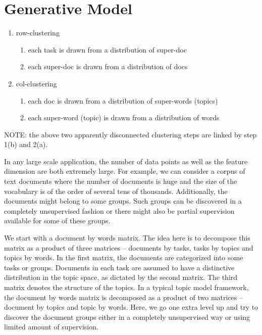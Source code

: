 \documentclass[10pts,fleqn]{article}
\begin{document}
\section{Generative Model}

\begin{enumerate}
	\item row-clustering
	\begin{enumerate}
		\item each task is drawn from a distribution of super-doc
		\item each super-doc is drawn from a distribution of docs
	\end{enumerate}
	\item col-clustering
	\begin{enumerate}
		\item each doc is drawn from a distribution of super-words (topics)
		\item each super-word (topic) is drawn from a distribution of words
	\end{enumerate}
\end{enumerate}
NOTE: the above two apparently disconnected clustering steps are linked by step 1(b) and 2(a).

In any large scale application, the number of data points as well as the feature
dimension are both extremely large. For example, we can consider a corpus of
text documents where the number of documents is huge and the size of the vocabulary is
of the order of several tens of thousands. Additionally, the documents might belong
to some groups. Such groups can be discovered in a completely unsupervised fashion
or there might also be partial supervision available for some of these groups.

We start with a document by words matrix. The idea here is to decompose this matrix as a product of
three matrices -- documents by tasks, tasks by topics and topics by words. In the
first matrix, the documents are categorized into some tasks or groups.
Documents in each task are assumed to have a distinctive
distribution in the topic space, as dictated by the second matrix.
The third matrix denotes the structure of the topics.
In a typical topic model framework, the document by words matrix is
decomposed as a product of two matrices -- document by topics and topic by words.
Here, we go one extra level up and try to discover the document groups
either in a completely unsupervised way or using limited amount of supervision.
\end{document}
